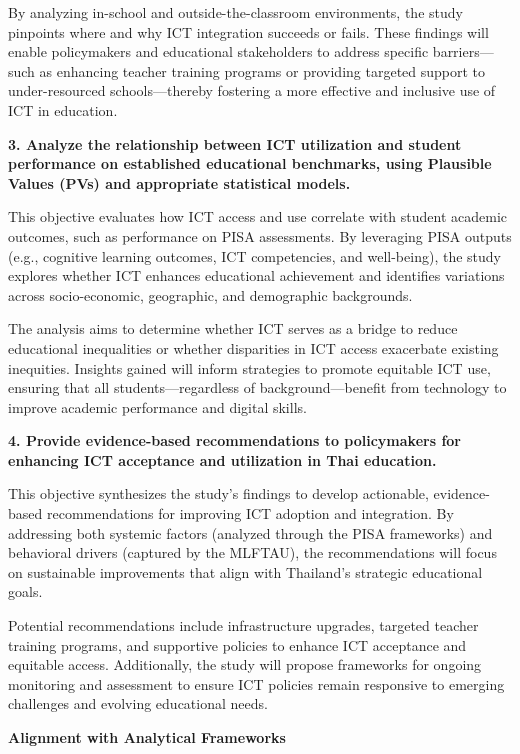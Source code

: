 \documentclass[
]{article}
\begin{document}
By analyzing in-school and outside-the-classroom environments, the study
pinpoints where and why ICT integration succeeds or fails. These
findings will enable policymakers and educational stakeholders to
address specific barriers---such as enhancing teacher training programs
or providing targeted support to under-resourced schools---thereby
fostering a more effective and inclusive use of ICT in education.

\textbf{3. Analyze the relationship between ICT utilization and student
performance on established educational benchmarks, using Plausible
Values (PVs) and appropriate statistical models.}

This objective evaluates how ICT access and use correlate with student
academic outcomes, such as performance on PISA assessments. By
leveraging PISA outputs (e.g., cognitive learning outcomes, ICT
competencies, and well-being), the study explores whether ICT enhances
educational achievement and identifies variations across socio-economic,
geographic, and demographic backgrounds.

The analysis aims to determine whether ICT serves as a bridge to reduce
educational inequalities or whether disparities in ICT access exacerbate
existing inequities. Insights gained will inform strategies to promote
equitable ICT use, ensuring that all students---regardless of
background---benefit from technology to improve academic performance and
digital skills.

\textbf{4. Provide evidence-based recommendations to policymakers for
enhancing ICT acceptance and utilization in Thai education.}

This objective synthesizes the study's findings to develop actionable,
evidence-based recommendations for improving ICT adoption and
integration. By addressing both systemic factors (analyzed through the
PISA frameworks) and behavioral drivers (captured by the MLFTAU), the
recommendations will focus on sustainable improvements that align with
Thailand's strategic educational goals.

Potential recommendations include infrastructure upgrades, targeted
teacher training programs, and supportive policies to enhance ICT
acceptance and equitable access. Additionally, the study will propose
frameworks for ongoing monitoring and assessment to ensure ICT policies
remain responsive to emerging challenges and evolving educational needs.

\textbf{Alignment with Analytical Frameworks}
\end{document}
